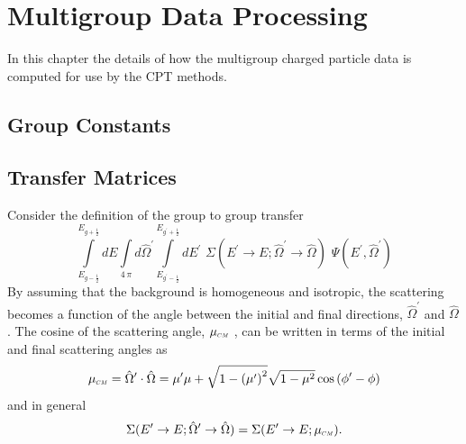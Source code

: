 \documentclass[../main.tex]{subfiles}
\begin{document}
\chapter{Multigroup Data Processing}
In this chapter the details of how the multigroup charged particle data is computed for use by the CPT methods.

\section{Group Constants}

\section{Transfer Matrices}
Consider the definition of the group to group transfer
\begin{equation} \label{eqn:g2g_transfer}
  \int\limits_{E_{g-\frac{1}{2}}}^{E_{g+\frac{1}{2}}} dE \int\limits_{4 \, \pi} d\hat{\Omega}^{\prime} \int\limits_{E_{g^{\prime}-\frac{1}{2}}}^{E_{g^{\prime}+\frac{1}{2}}} dE^{\prime} \,\, \Sigma(E^{\prime}\rightarrow E; \hat{\Omega}^{\prime} \rightarrow \hat{\Omega}) \,\, \Psi(E^{\prime},\hat{\Omega}^{\prime})
\end{equation}
By assuming that the background is homogeneous and isotropic, the scattering becomes a function of the angle between the initial and final directions, $\hat{\Omega}^{\prime}$ and $\hat{\Omega}$. The cosine of the scattering angle, $\mucm$ , can be written in terms of the initial and final scattering angles as
\begin{equation}
 \mucm = \hat{\Omega}^{\prime} \cdot \hat{\Omega} = \mu^{\prime} \mu + \sqrt{1-\left(\mu^{\prime}\right)^2} \sqrt{1-\mu^{2}} \cos\left(\phi^{\prime} - \phi \right) 
\end{equation}
and in general
\begin{equation} \label{eqn:mucm_dxs}
  \Sigma(E^{\prime}\rightarrow E; \hat{\Omega}^{\prime} \rightarrow \hat{\Omega}) = \Sigma(E^{\prime}\rightarrow E; \mucm).
\end{equation}
\end{document}
